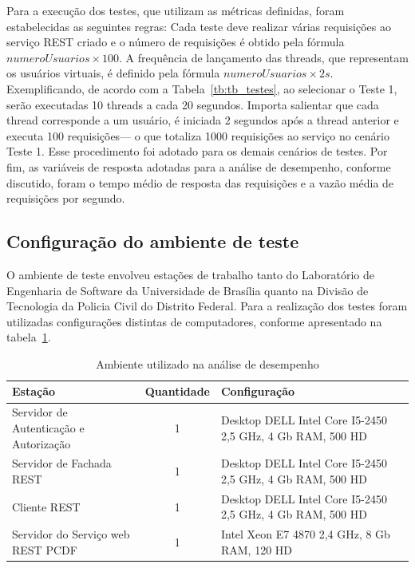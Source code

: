Para a execução dos testes, que utilizam as métricas definidas, foram estabelecidas as seguintes regras: Cada teste deve realizar várias requisições ao serviço REST 
criado e o número de requisições é obtido pela fórmula $numeroUsuarios \times 100$. A frequência de lançamento das threads, 
que representam os usuários virtuais, é definido pela fórmula $numeroUsuarios \times 2s$. Exemplificando, 
de acordo com a Tabela~\ref{tb:tb_testes}, ao selecionar o Teste 1, serão executadas 10 threads a cada 20 segundos. 
Importa salientar que cada thread corresponde a um usuário, é iniciada 2 segundos após a thread anterior e executa 100 requisições---
o que totaliza 1000 requisições ao serviço no cen\'{a}rio Teste 1. Esse procedimento foi adotado para os demais cen\'{a}rios de testes. 
Por fim, as variáveis de resposta adotadas para a análise de desempenho, conforme discutido, 
foram o tempo médio de resposta das requisições e a vazão média de requisições por segundo.

\subsection{Configuração do ambiente de teste}

O ambiente de teste envolveu estações de trabalho tanto do Laboratório de Engenharia de Software da Universidade de Brasília quanto na 
Divisão de Tecnologia da Policia Civil do Distrito Federal. Para a realização dos testes foram 
utilizadas configurações distintas de computadores, conforme apresentado na tabela~\ref{tb:estudo_caso1}.

\begin{table}[h]
\begin{center}
    \begin{tabular}{|p{6cm}|c|p{6cm}|}
    \hline
    Esta\c c\~{a}o                  & Quantidade & Configura\c c\~{a}o \\ \hline
    Servidor de Autenticação e Autorização     & 1          & Desktop DELL Intel Core I5-2450 2,5 GHz, 4 Gb RAM, 500 HD \\ \hline
    Servidor de Fachada REST                   & 1          & Desktop DELL Intel Core I5-2450 2,5 GHz, 4 Gb RAM, 500 HD \\ \hline
    Cliente REST                               & 1          & Desktop DELL Intel Core I5-2450 2,5 GHz, 4 Gb RAM, 500 HD \\ \hline
    Servidor do Serviço web REST PCDF       & 1          & Intel Xeon E7 4870 2,4 GHz, 8 Gb RAM, 120 HD \\ \hline
    \end{tabular}
    \caption {Ambiente utilizado na análise de desempenho}\label{tb:estudo_caso1}
\end{center}
\end{table}

